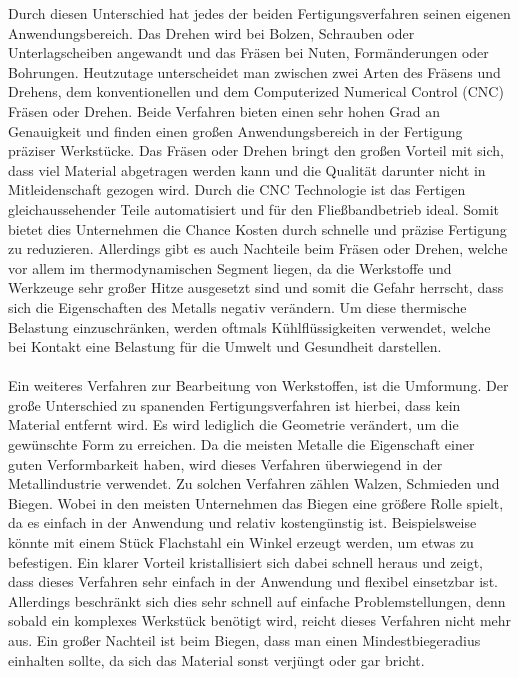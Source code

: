Durch diesen Unterschied hat jedes der beiden Fertigungsverfahren seinen eigenen Anwendungsbereich. Das Drehen wird \zB bei Bolzen, Schrauben oder 
Unterlagscheiben angewandt und das Fräsen bei \zB Nuten, Formänderungen oder Bohrungen. Heutzutage unterscheidet man zwischen zwei Arten des Fräsens 
und Drehens, dem konventionellen und dem Computerized Numerical Control (CNC) Fräsen oder Drehen. Beide Verfahren bieten einen sehr hohen Grad an Genauigkeit 
und finden einen großen Anwendungsbereich in der Fertigung präziser Werkstücke. Das Fräsen oder Drehen bringt den großen Vorteil mit sich, dass viel Material 
abgetragen werden kann und die Qualität darunter nicht in Mitleidenschaft gezogen wird. Durch die CNC Technologie ist das Fertigen gleichaussehender Teile 
automatisiert und für den Fließbandbetrieb ideal. Somit bietet dies Unternehmen die Chance Kosten durch schnelle und präzise Fertigung zu reduzieren. 
Allerdings gibt es auch Nachteile beim Fräsen oder Drehen, welche vor allem im thermodynamischen Segment liegen, da die Werkstoffe und Werkzeuge sehr 
großer Hitze ausgesetzt sind und somit die Gefahr herrscht, dass sich die Eigenschaften \zB des Metalls negativ verändern. Um diese thermische Belastung 
einzuschränken, werden oftmals Kühlflüssigkeiten verwendet, welche bei Kontakt eine Belastung für die Umwelt und Gesundheit darstellen. \autocite{Dietrich.2020} 
\\\\
Ein weiteres Verfahren zur Bearbeitung von Werkstoffen, ist die Umformung. Der große Unterschied zu spanenden Fertigungsverfahren ist hierbei, dass kein 
Material entfernt wird. Es wird lediglich die Geometrie verändert, um die gewünschte Form zu erreichen. Da die meisten Metalle die Eigenschaft einer guten 
Verformbarkeit haben, wird dieses Verfahren überwiegend in der Metallindustrie verwendet. Zu solchen Verfahren zählen \zB Walzen, Schmieden und Biegen. Wobei 
in den meisten Unternehmen das Biegen eine größere Rolle spielt, da es einfach in der Anwendung und relativ kostengünstig ist. Beispielsweise könnte mit einem 
Stück Flachstahl ein Winkel erzeugt werden, um etwas zu befestigen. Ein klarer Vorteil kristallisiert sich dabei schnell heraus und zeigt, dass dieses 
Verfahren sehr einfach in der Anwendung und flexibel einsetzbar ist. Allerdings beschränkt sich dies sehr schnell auf einfache Problemstellungen, denn 
sobald ein komplexes Werkstück benötigt wird, reicht dieses Verfahren nicht mehr aus. Ein großer Nachteil ist beim Biegen, dass man einen Mindestbiegeradius 
einhalten sollte, da sich das Material sonst verjüngt oder gar bricht.
